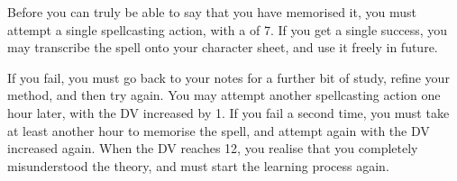 Before you can truly be able to say that you have memorised it, you must attempt a single spellcasting action, with a  of 7. If you get a single success, you may transcribe the spell onto your character sheet, and use it freely in future. 

If you fail, you must go back to your notes for a further bit of study, refine your method, and then try again. You may attempt another spellcasting action one hour later, with the DV increased by 1. If you fail a second time, you must take at least another hour to memorise the spell, and attempt again with the DV increased again. When the DV reaches 12, you realise that you completely misunderstood the theory, and must start the learning process again. 
